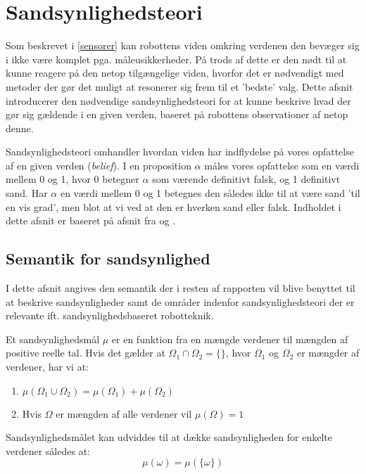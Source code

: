 

\section{Sandsynlighedsteori}
Som beskrevet i \cref{sensorer} kan robottens viden omkring verdenen den bevæger sig i ikke være komplet pga. måleusikkerheder.
På trods af dette er den nødt til at kunne reagere på den netop tilgængelige viden, hvorfor det er nødvendigt med metoder der gør det muligt at resonerer sig frem til et 'bedste' valg.
Dette afsnit introducerer den nødvendige sandsynlighedsteori for at kunne beskrive hvad der gør sig gældende i en given verden, baseret på robottens observationer af netop denne.

Sandsynlighedsteori omhandler hvordan viden har indflydelse på vores opfattelse af en given verden (\textit{belief}).
I en proposition $\alpha$ måles vores opfattelse som en værdi mellem 0 og 1, hvor 0 betegner $\alpha$ som værende definitivt falsk, og 1 definitivt sand.
Har $\alpha$ en værdi mellem 0 og 1 betegnes den således ikke til at være sand 'til en vis grad', men blot at vi ved at den er hverken sand eller falsk.
Indholdet i dette afsnit er baseret på afsnit fra \cite{ArtificialIntelligence} og \cite{probabilisticRobotics}.

\subsection{Semantik for sandsynlighed}
I dette afsnit angives den semantik der i resten af rapporten vil blive benyttet til at beskrive sandsynligheder 
samt de områder indenfor sandsynlighedsteori der er relevante ift. sandsynlighedsbaseret robotteknik.

Et sandsynlighedsmål $\mu$ er en funktion fra en mængde verdener til mængden af positive reelle tal. 
Hvis det gælder at $\Omega_1 \cap \Omega_2 = \{{}\}$, hvor $\Omega_1$ og $\Omega_2$ er mængder af verdener, har vi at:

\begin{enumerate}
\item $\mu(\Omega_1 \cup \Omega_2) = \mu(\Omega_1) + \mu(\Omega_2)$
\item Hvis $\Omega$ er mængden af alle verdener vil $\mu(\Omega) = 1$ 
\end{enumerate}

Sandsynlighedsmålet kan udviddes til at dække sandsynligheden for enkelte verdener således at:
\begin{equation}
\mu(\omega) = \mu(\{\omega\})
\end{equation}


